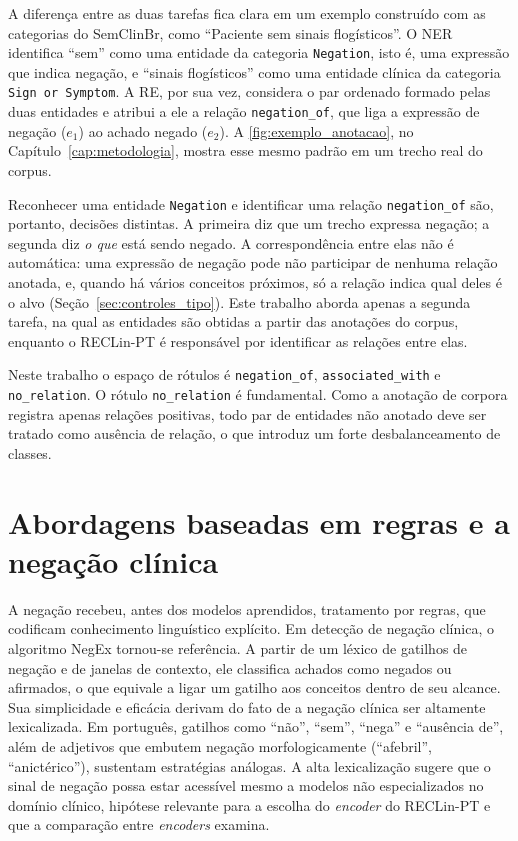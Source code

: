 A diferença entre as duas tarefas fica clara em um exemplo construído com as
categorias do SemClinBr, como ``Paciente sem sinais flogísticos''. O NER identifica
``sem'' como uma entidade da categoria \texttt{Negation}, isto é, uma expressão que
indica negação, e ``sinais flogísticos'' como uma entidade clínica da categoria
\texttt{Sign or Symptom}. A RE, por sua vez, considera o par ordenado formado pelas
duas entidades e atribui a ele a relação \texttt{negation\_of}, que liga a expressão
de negação ($e_1$) ao achado negado ($e_2$). A \autoref{fig:exemplo_anotacao}, no
Capítulo~\ref{cap:metodologia}, mostra esse mesmo padrão em um trecho real do corpus.

Reconhecer uma entidade \texttt{Negation} e identificar uma relação
\texttt{negation\_of} são, portanto, decisões distintas. A primeira diz que um
trecho expressa negação; a segunda diz \emph{o que} está sendo negado. A
correspondência entre elas não é automática: uma expressão de negação pode não
participar de nenhuma relação anotada, e, quando há vários conceitos próximos, só a
relação indica qual deles é o alvo (Seção~\ref{sec:controles_tipo}). Este trabalho aborda apenas a segunda tarefa, na qual as entidades são obtidas a partir das anotações do corpus, enquanto o RECLin-PT é responsável por identificar as relações entre elas.

Neste trabalho o espaço de rótulos é \texttt{negation\_of},
\texttt{associated\_with} e \texttt{no\_relation}. O rótulo
\texttt{no\_relation} é fundamental. Como a anotação de corpora registra apenas
relações positivas, todo par de entidades não anotado deve ser tratado como
ausência de relação, o que introduz um forte desbalanceamento de classes.

\section{Abordagens baseadas em regras e a negação clínica}

A negação recebeu, antes dos modelos aprendidos, tratamento por regras, que
codificam conhecimento linguístico explícito. Em detecção de negação clínica, o
algoritmo NegEx \cite{chapman_2001_negex} tornou-se referência. A partir de um léxico
de gatilhos de negação e de janelas de contexto, ele classifica achados como negados
ou afirmados, o que equivale a ligar um gatilho aos conceitos dentro de seu alcance.
Sua simplicidade e eficácia derivam do fato de a negação clínica ser altamente
lexicalizada. Em português, gatilhos como ``não'', ``sem'', ``nega'' e ``ausência
de'', além de adjetivos que embutem negação morfologicamente (``afebril'',
``anictérico''), sustentam estratégias análogas. A alta lexicalização sugere que o
sinal de negação possa estar acessível mesmo a modelos não especializados no domínio
clínico, hipótese relevante para a escolha do \emph{encoder} do RECLin-PT e que a
comparação entre \emph{encoders} examina.

